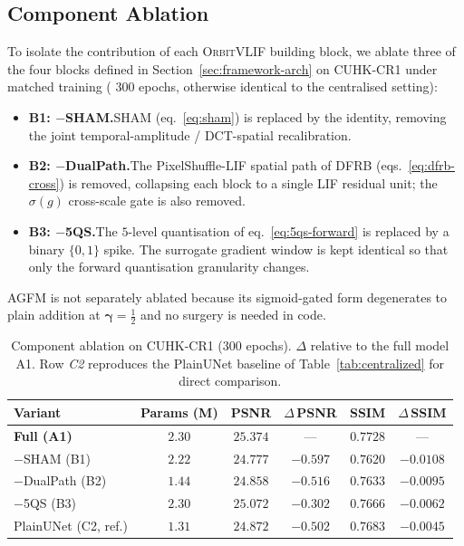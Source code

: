 \documentclass[conference]{IEEEtran}
\newcommand{\OrbitVLIF}{\textsc{OrbitVLIF}}
\newcommand{\DFRB}{\textsc{DFRB}}
\newcommand{\SHAM}{\textsc{SHAM}}
\newcommand{\FQS}{\textsc{5QS}}
\newcommand{\AGFM}{\textsc{AGFM}}
\begin{document}
\subsection{Component Ablation}\label{sec:exp-ablation}

To isolate the contribution of each \OrbitVLIF{} building block, we
ablate three of the four blocks defined in
Section~\ref{sec:framework-arch} on CUHK-CR1 under matched training
( $300$ epochs, otherwise identical to the centralised setting):

\begin{itemize}
  \item \textbf{B1: $-$\SHAM{}.}\;\;\SHAM{} (eq.~\ref{eq:sham}) is
        replaced by the identity, removing the joint
        temporal-amplitude / DCT-spatial recalibration.
  \item \textbf{B2: $-$DualPath.}\;\;The PixelShuffle-LIF spatial
        path of \DFRB{} (eqs.~\ref{eq:dfrb-cross}) is removed,
        collapsing each block to a single LIF residual unit; the
        $\sigma(g)$ cross-scale gate is also removed.
  \item \textbf{B3: $-$\FQS{}.}\;\;The $5$-level quantisation of
        eq.~\ref{eq:5qs-forward} is replaced by a binary
        $\{0,1\}$ spike. The surrogate gradient window is kept
        identical so that only the forward quantisation
        granularity changes.
\end{itemize}

\AGFM{} is not separately ablated because its sigmoid-gated form
degenerates to plain addition at $\boldsymbol{\gamma}\!=\!\tfrac12$ and
no surgery is needed in code.

\begin{table}[!htbp]
\centering
\caption{Component ablation on CUHK-CR1 ($300$ epochs).
$\Delta$ relative to the full model A1.  Row \emph{C2} reproduces
the PlainUNet baseline of Table~\ref{tab:centralized}
for direct comparison.}
\label{tab:ablation}
\begin{tabular}{lccccc}
\toprule
Variant & Params (M) & PSNR & $\Delta$\,PSNR & SSIM & $\Delta$\,SSIM \\
\midrule
\textbf{Full (A1)}        & $2.30$ & $\mathbf{25.374}$ & ---         & $\mathbf{0.7728}$ & ---           \\
$-$\SHAM{} (B1)           & $2.22$ & $24.777$         & $-0.597$    & $0.7620$         & $-0.0108$    \\
$-$DualPath (B2)          & $1.44$ & $24.858$         & $-0.516$    & $0.7633$         & $-0.0095$    \\
$-$\FQS{} (B3)            & $2.30$ & $25.072$         & $-0.302$    & $0.7666$         & $-0.0062$    \\
\midrule
PlainUNet (C2, ref.)      & $1.31$ & $24.872$         & $-0.502$    & $0.7683$         & $-0.0045$    \\
\bottomrule
\end{tabular}
\end{table}
\end{document}
